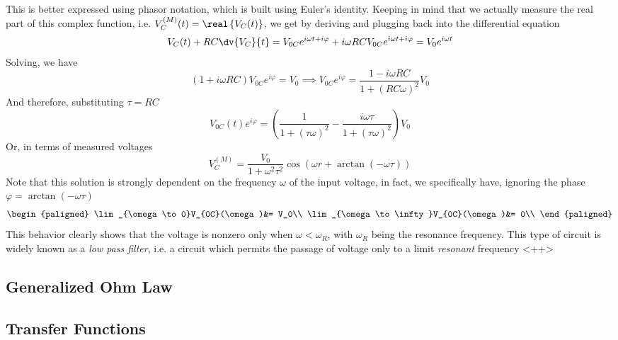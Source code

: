 \documentclass[../electromagnetism.tex]{subfiles}
\begin{document}
This is better expressed using phasor notation, which is built using Euler's identity. Keeping in mind that we actually measure the real part of this complex function, i.e. $V_C^{(M)}(t)=\real\left\{ V_{C}(t) \right\}$, we get by deriving and plugging back into the differential equation
\begin{equation*}
	V_C(t)+RC\dv{V_C}{t}=V_{0C}e^{i\omega t+i\varphi}+i\omega RCV_{0C}e^{i\omega t+i\varphi}=V_0e^{i\omega t}
\end{equation*}
Solving, we have
\begin{equation*}
	\left( 1+i\omega RC \right)V_{0C}e^{i\varphi}=V_0\implies V_{0C}e^{i\varphi}=\frac{1-i\omega RC}{1+\left( RC\omega \right)^2}V_0
\end{equation*}
And therefore, substituting $\tau=RC$
\begin{equation}
	V_{0C}(t)e^{i\varphi}=\left( \frac{1}{1+\left( \tau\omega \right)^2}-\frac{i\omega \tau}{1+\left( \tau\omega \right)^2} \right)V_0
	\label{eq:solutionrcac.ac}
\end{equation}
Or, in terms of measured voltages
\begin{equation}
	V_{C}^{(M)}=\frac{V_0}{1+\omega^2\tau^2}\cos\left( \omega r+\arctan\left( -\omega\tau \right) \right)
	\label{eq:measuredvoltrc.ac}
\end{equation}
Note that this solution is strongly dependent on the frequency $\omega$ of the input voltage, in fact, we specifically have, ignoring the phase $\varphi=\arctan\left( -\omega\tau \right)$
\begin{equation}
	\begin{paligned}
		\lim_{\omega\to0}V_{0C}(\omega)&= V_0\\
		\lim_{\omega\to\infty}V_{0C}(\omega)&= 0\\
	\end{paligned}
	\label{eq:filterbehaviorrc.ac}
\end{equation}
This behavior clearly shows that the voltage is nonzero only when $\omega<\omega_R$, with $\omega_R$ being the resonance frequency. This type of circuit is widely known as a \textit{low pass filter}, i.e. a circuit which permits the passage of voltage only to a limit \textit{resonant} frequency <++>
\subsection{Generalized Ohm Law}
\subsection{Transfer Functions}
\end{document}
